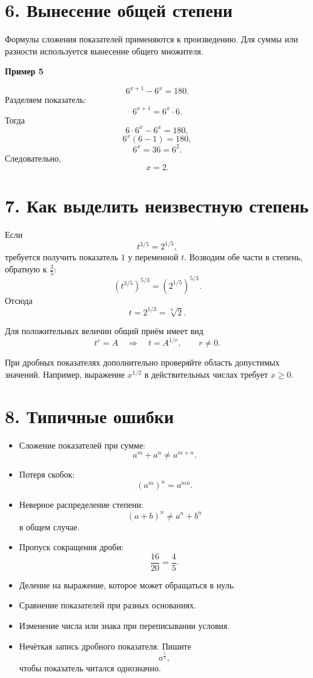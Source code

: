\documentclass[a4paper,12pt]{article}
\newcommand{\sectionline}{%
    \par\noindent{\color{accent}\rule{\linewidth}{0.7pt}}\par
}
\newcommand{\important}[1]{%
    \par\smallskip
    {\color{darkaccent}\bfseries #1}
    \par\smallskip
}
\begin{document}
\section*{\color{darkaccent}6. Вынесение общей степени}
\sectionline

Формулы сложения показателей применяются к произведению. Для суммы или
разности используется вынесение общего множителя.

\important{Пример 5}

\[
6^{x+1}-6^x=180.
\]
Разделяем показатель:
\[
6^{x+1}=6^x\cdot6.
\]
Тогда
\[
6\cdot6^x-6^x=180,
\]
\[
6^x(6-1)=180,
\]
\[
6^x=36=6^2.
\]
Следовательно,
\[
x=2.
\]

\section*{\color{darkaccent}7. Как выделить неизвестную степень}
\sectionline

Если
\[
t^{3/5}=2^{1/5},
\]
требуется получить показатель \(1\) у переменной \(t\). Возводим обе части
в степень, обратную к \(\frac35\):
\[
\left(t^{3/5}\right)^{5/3}
=
\left(2^{1/5}\right)^{5/3}.
\]
Отсюда
\[
t=2^{1/3}=\sqrt[3]{2}.
\]

Для положительных величин общий приём имеет вид
\[
t^r=A
\quad\Longrightarrow\quad
t=A^{1/r},
\qquad r\ne0.
\]

При дробных показателях дополнительно проверяйте область допустимых значений.
Например, выражение \(x^{1/2}\) в действительных числах требует \(x\ge0\).

\section*{\color{darkaccent}8. Типичные ошибки}
\sectionline

\begin{itemize}
    \item Сложение показателей при сумме:
    \[
    a^m+a^n\ne a^{m+n}.
    \]
    \item Потеря скобок:
    \[
    (a^m)^n=a^{mn}.
    \]
    \item Неверное распределение степени:
    \[
    (a+b)^n\ne a^n+b^n
    \]
    в общем случае.
    \item Пропуск сокращения дроби:
    \[
    \frac{16}{20}=\frac45.
    \]
    \item Деление на выражение, которое может обращаться в нуль.
    \item Сравнение показателей при разных основаниях.
    \item Изменение числа или знака при переписывании условия.
    \item Нечёткая запись дробного показателя. Пишите
    \[
    a^{\frac15},
    \]
    чтобы показатель читался однозначно.
\end{itemize}
\end{document}
